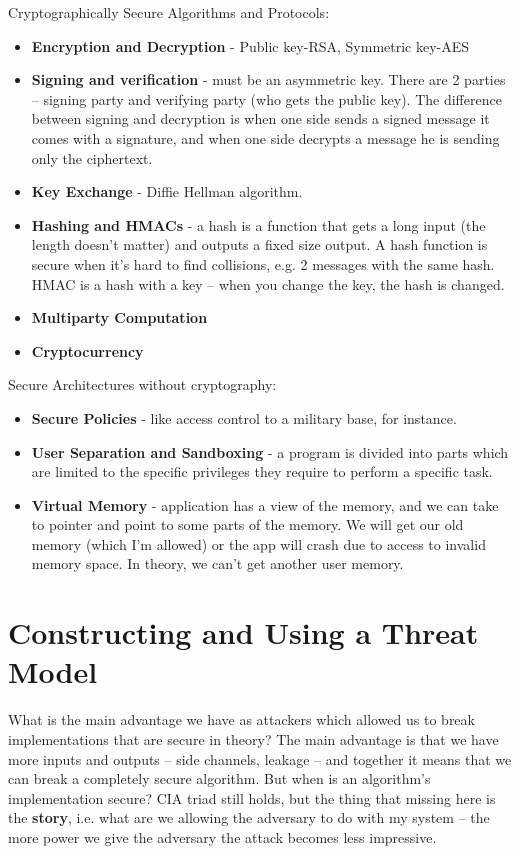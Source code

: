 Cryptographically Secure Algorithms and Protocols:
\begin{itemize}
    \item \textbf{Encryption and Decryption} - Public key-RSA, Symmetric key-AES
    \item \textbf{Signing and verification} - must be an asymmetric key. There
    are 2 parties – signing party and verifying party (who gets the public key).
    The difference between signing and decryption is when one side sends a
    signed message it comes with a signature, and when one side decrypts a
    message he is sending only the ciphertext.
    \item \textbf{Key Exchange} - Diffie Hellman algorithm.
    \item \textbf{Hashing and HMACs} - a hash is a function that gets a long
    input (the length doesn't matter) and outputs a fixed size output. A hash
    function is secure when it's hard to find collisions, e.g. 2 messages with
    the same hash. HMAC is a hash with a key – when you change the key, the hash
    is changed.
    \item \textbf{Multiparty Computation}
    \item \textbf{Cryptocurrency}
\end{itemize}

Secure Architectures without cryptography:
\begin{itemize}
    \item \textbf{Secure Policies} - like access control to a military base, for
    instance.
    \item \textbf{User Separation and Sandboxing} - a program is divided into
    parts which are limited to the specific privileges they require to perform a
    specific task.
    \item \textbf{Virtual Memory} - application has a view of the memory, and we
    can take to pointer and point to some parts of the memory. We will get our
    old memory (which I'm allowed) or the app will crash due to access to
    invalid memory space. In theory, we can't get another user memory.
\end{itemize}

\section{Constructing and Using a Threat Model} \label{sec:BreakImpl}

What is the main advantage we have as attackers which allowed us to break
implementations that are secure in theory? The main advantage is that we have
more inputs and outputs – side channels, leakage – and together it means that we
can break a completely secure algorithm. But when is an algorithm's
implementation secure? CIA triad still holds, but the thing that missing here is
the \textbf{story}, i.e. what are we allowing the adversary to do with my system
– the more power we give the adversary the attack becomes less impressive. 

